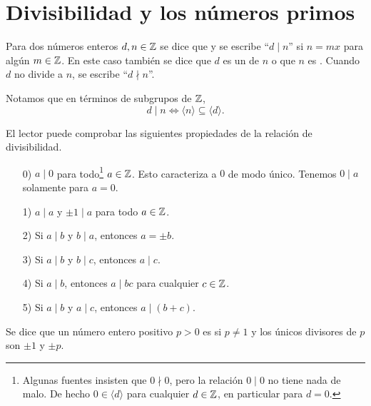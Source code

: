\documentclass{article}
\numberwithin{equation}{section}
\begin{document}

\section{Divisibilidad y los números primos}

\begin{definicion}
  Para dos números enteros $d,n\in \mathbb{Z}$ se dice que
   y se escribe ``$d\mid n$'' si
  $n = mx$ para algún $m\in \mathbb{Z}$. En este caso también se dice que $d$ es un
   de $n$ o que $n$ es . Cuando $d$ no
  divide a $n$, se escribe ``$d\nmid n$''.
\end{definicion}

Notamos que en términos de subgrupos de $\mathbb{Z}$,
$$d\mid n \iff \langle n\rangle \subseteq \langle d\rangle.$$

El lector puede comprobar las siguientes propiedades de la relación de
divisibilidad.

\begin{enumerate}
\item[0)] $a\mid 0$ para todo\footnote{Algunas fuentes insisten que $0\nmid 0$,
    pero la relación $0\mid 0$ no tiene nada de malo. De hecho
    $0\in \langle d\rangle$ para cualquier $d\in\mathbb{Z}$, en particular para
    $d = 0$.} $a\in\mathbb{Z}$. Esto caracteriza a $0$ de modo único. Tenemos
  $0 \mid a$ solamente para $a = 0$.

\item[1)] $a\mid a$ y $\pm 1\mid a$ para todo $a\in\mathbb{Z}$.

\item[2)] Si $a\mid b$ y $b\mid a$, entonces $a = \pm b$.

\item[3)] Si $a\mid b$ y $b\mid c$, entonces $a\mid c$.

\item[4)] Si $a\mid b$, entonces $a\mid bc$ para cualquier $c\in \mathbb{Z}$.

\item[5)] Si $a\mid b$ y $a\mid c$, entonces $a\mid (b+c)$.
\end{enumerate}

\begin{definicion}
  Se dice que un número entero positivo $p > 0$ es
   si $p\ne 1$ y los únicos divisores de $p$
  son $\pm 1$ y $\pm p$.
\end{definicion}
\end{document}
